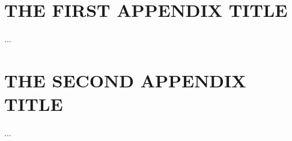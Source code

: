 \documentclass[thesis,proposal]{umassthesis}  %
\begin{document}

\appendix
\chapter{THE FIRST APPENDIX TITLE}
...
\chapter{THE SECOND APPENDIX TITLE}
...

\backmatter  %


\nocite{*}


\end{document}
